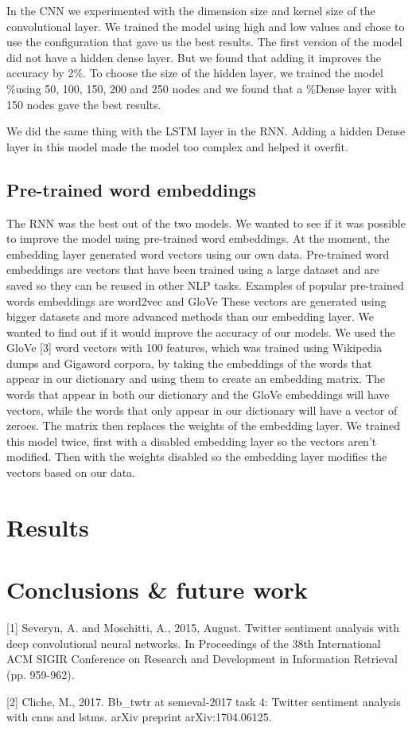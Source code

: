 \documentclass{article}
\begin{document}
In the CNN we experimented with the dimension size and kernel size of the
convolutional layer. We trained the model using high and low values and chose to
use the configuration that gave us the best results. The first version of the
model did not have a hidden dense layer. But we found that adding it improves
the accuracy by 2\%. To choose the size of the hidden layer, we trained the
model \%using 50, 100, 150, 200 and 250 nodes and we found that a \%Dense layer with 150 nodes gave the best results.

We did the same thing with the LSTM layer in the RNN. Adding a hidden Dense
layer in this model made the model too complex and helped it overfit.

\subsection{Pre-trained word embeddings}
The RNN was the best out of the two models. We wanted to see if it was possible
to improve the model using pre-trained word embeddings. At the moment, the
embedding layer generated word vectors using our own data. Pre-trained word
embeddings are vectors that have been trained using a large dataset and are
saved so they can be reused in other NLP tasks. Examples of popular pre-trained
words embeddings are word2vec and GloVe These vectors are generated using bigger
datasets and more advanced methods than our embedding layer. We wanted to find
out if it would improve the accuracy of our models. We used the GloVe [3] word
vectors with 100 features, which was trained using Wikipedia dumps and Gigaword
corpora, by taking the embeddings of the words that appear in our dictionary and
using them to create an embedding matrix. The words that appear in both our
dictionary and the GloVe embeddings will have vectors, while the words that only
appear in our dictionary will have a vector of zeroes. The matrix then replaces
the weights of the embedding layer. We trained this model twice, first with a
disabled embedding layer so the vectors aren’t modified. Then with the weights
disabled so the embedding layer modifies the vectors based on our data.

\section{Results}

\section{Conclusions \& future work}


\small

[1] Severyn, A. and Moschitti, A., 2015, August. Twitter sentiment analysis with
deep convolutional neural networks. In Proceedings of the 38th International ACM
SIGIR Conference on Research and Development in Information Retrieval (pp.
959-962).

[2] Cliche, M., 2017. Bb\_twtr at semeval-2017 task 4: Twitter sentiment analysis with cnns and lstms. arXiv preprint arXiv:1704.06125.
\end{document}
